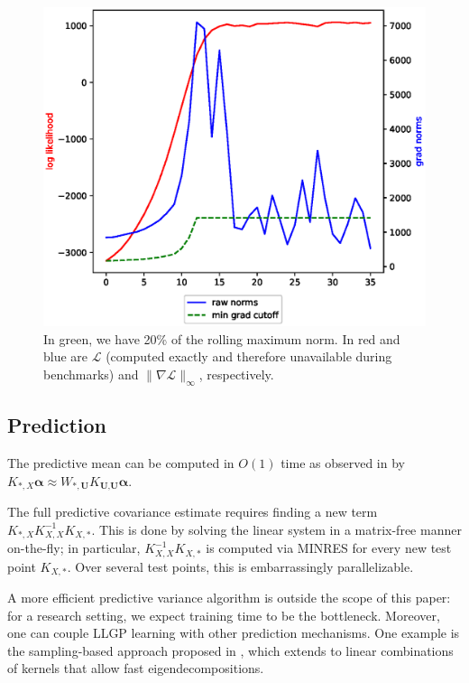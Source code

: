 \documentclass{article}
\def\bsa{{\boldsymbol\alpha}}
\def \mcL {\mathcal{L}}
\def\TU{\textbf{U}}
\newcommand{\norm}[1]{\mathopen\| #1 \mathclose\|}%
\begin{document}
\begin{figure}[!ht]
\vskip 0.2in
\begin{center}
\centerline{\includegraphics[width=\columnwidth]{running_cutoff.eps}}
\caption{In green, we have 20\% of the rolling maximum norm. In red and blue are $\mcL$ (computed exactly and therefore unavailable during benchmarks) and $ \norm{\nabla\mcL}_\infty $, respectively. }
\label{fx2007-stop}
\end{center}
\vskip -0.2in
\end{figure}

\subsection{Prediction}

The predictive mean can be computed in $O(1)$ time as observed in \cite{msgp} by $K_{*,X}\bsa\approx W_{*,\TU}K_{\TU,\TU}\bsa$.

The full predictive covariance estimate requires finding a new term $K_{*,X}K_{X,X}^{-1}K_{X,*}$. This is done by solving the linear system in a matrix-free manner on-the-fly; in particular, $K_{X,X}^{-1}K_{X,*}$ is computed via MINRES for every new test point $K_{X,*}$. Over several test points, this is embarrassingly parallelizable.

A more efficient predictive variance algorithm is outside the scope of this paper: for a research setting, we expect training time to be the bottleneck. Moreover, one can couple LLGP learning with other prediction mechanisms. One example is the sampling-based approach proposed in \cite{papandreou2011efficient}, which extends to linear combinations of kernels that allow fast eigendecompositions.
\end{document}
